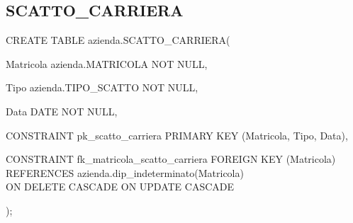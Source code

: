         \subsection{SCATTO\_CARRIERA}
            \ttfamily
                \begin{flushleft}
                    \begin{description}
                        \item CREATE TABLE azienda.SCATTO\_CARRIERA(                
                        \begin{description}
                            \item Matricola azienda.MATRICOLA NOT NULL,
                            \item Tipo azienda.TIPO\_SCATTO NOT NULL,
                            \item Data DATE NOT NULL,
                            
                            \vspace{0.5cm}

                            \item CONSTRAINT pk\_scatto\_carriera PRIMARY KEY (Matricola, Tipo, Data),
                            \item CONSTRAINT fk\_matricola\_scatto\_carriera FOREIGN KEY (Matricola)\\
                            REFERENCES azienda.dip\_indeterminato(Matricola)\\
                            ON DELETE CASCADE	ON UPDATE CASCADE
                        \end{description}
                        );
                    \end{description}
                \end{flushleft}
            \normalfont

\newpage

